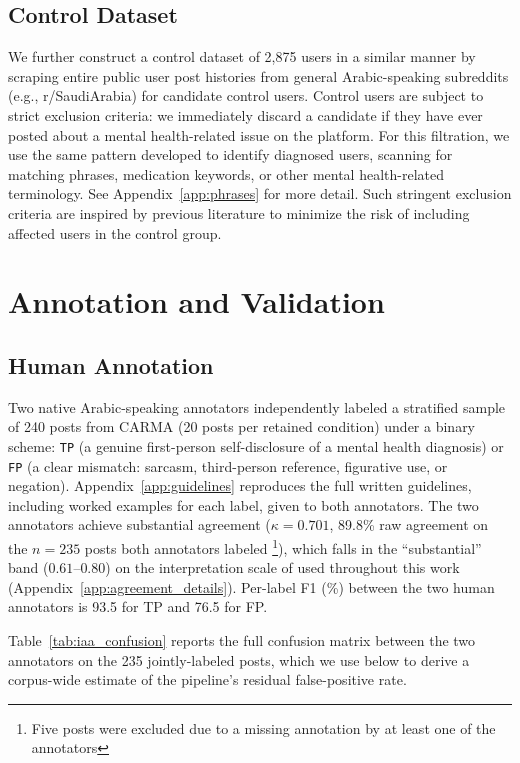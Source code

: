 \documentclass[letterpaper]{article} %
\begin{document}
\subsection{Control Dataset}
We further construct a control dataset of 2,875 users in a similar manner by scraping entire public user post histories from general Arabic-speaking subreddits (e.g., r/SaudiArabia) for candidate control users. Control users are subject to strict exclusion criteria: we immediately discard a candidate if they have ever posted about a mental health-related issue on the platform. For this filtration, we use the same pattern developed to identify diagnosed users, scanning for matching phrases, medication keywords, or other mental health-related terminology. See Appendix~\ref{app:phrases} for more detail. Such stringent exclusion criteria are inspired by previous literature \cite{cohan-etal-2018-smhd} to minimize the risk of including affected users in the control group.

\section{Annotation and Validation}
\label{sec:annotation}

\subsection{Human Annotation}
\label{subsec:human_annotation}
Two native Arabic-speaking annotators
independently labeled a stratified sample of 240 posts from CARMA (20
posts per retained condition) under a binary scheme:
\texttt{TP} (a genuine first-person self-disclosure of a mental health
diagnosis) or \texttt{FP} (a clear mismatch:
sarcasm, third-person reference, figurative use, or negation). Appendix~\ref{app:guidelines}
reproduces the full written guidelines, including worked examples for
each label, given to both annotators. The two annotators achieve substantial agreement ($\kappa = 0.701$,
89.8\% raw agreement on the $n{=}235$ posts both annotators labeled \footnote{Five posts were excluded due to a missing annotation by at least one of the annotators}),
which falls in the ``substantial'' band ($0.61$--$0.80$) on the
interpretation scale of \citet{landis1977measurement} used throughout this
work (Appendix~\ref{app:agreement_details}). Per-label F1 (\%) between the two human annotators is 93.5 for TP and 76.5 for FP.


Table~\ref{tab:iaa_confusion} reports the full confusion matrix between
the two annotators on the 235 jointly-labeled posts, which we use below
to derive a corpus-wide estimate of the pipeline's residual
false-positive rate.
\end{document}
